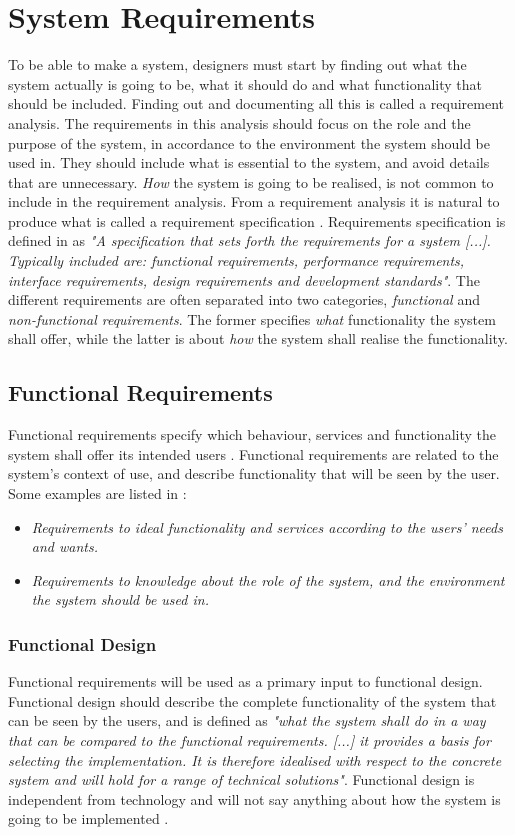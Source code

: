 \section{System Requirements}
\label{sec:systemreq}
To be able to make a system, designers must start by finding out what the system actually is going to be, what it should do and what functionality that should be included. Finding out and documenting all this is called a requirement analysis. The requirements in this analysis should focus on the role and the purpose of the system, in accordance to the environment the system should be used in. They should include what is essential to the system, and avoid details that are unnecessary. \emph{How} the system is going to be realised, is not common to include in the requirement analysis. From a requirement analysis it is natural to produce what is called a requirement specification \cite{braude2000software}. Requirements specification is defined in \cite{systemutviklingDel1} as \emph{"A specification that sets forth the requirements for a system [...]. Typically included are: functional requirements, performance requirements, interface requirements, design requirements and development standards"}. The different requirements are often separated into two categories, \emph{functional} and \emph{non-functional requirements}. The former specifies \emph{what} functionality the system shall offer, while the latter is about \emph{how} the system shall realise the functionality. 

\subsection{Functional Requirements}
Functional requirements specify which behaviour, services and functionality the system shall offer its intended users \cite{systemutviklingDel1} \cite{mmi}. Functional requirements are related to the system's context of use, and describe functionality that will be seen by the user. Some examples are listed in \cite{systemutviklingDel1}:
\begin{itemize}
\item \emph{Requirements to ideal functionality and services according to the users' needs and wants.}
\item \emph{Requirements to knowledge about the role of the system, and the environment the system should be used in.}
\end{itemize}     

\subsubsection{Functional Design}
Functional requirements will be used as a primary input to functional design. Functional design should describe the complete functionality of the system that can be seen by the users, and is defined as \emph{"what the system shall do in a way that can be compared to the functional requirements. [...] it provides a basis for selecting the implementation. It is therefore idealised with respect to the concrete system and will hold for a range of technical solutions"}. Functional design is independent from technology and will not say anything about how the system is going to be implemented \cite{systemutviklingDel1}. 

